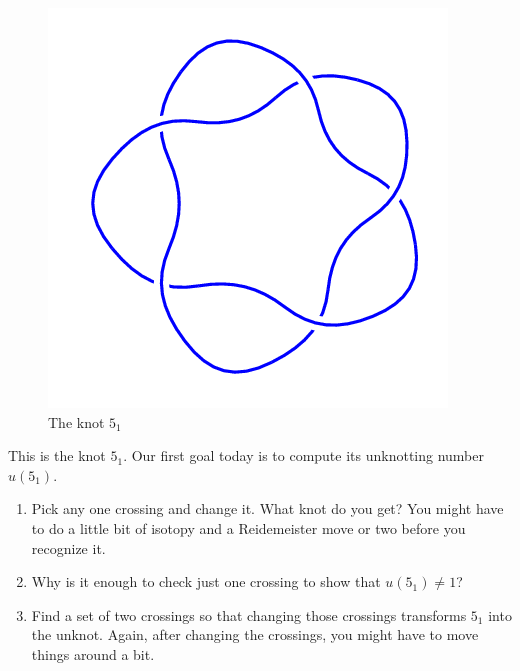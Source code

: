 \documentclass[12pt,letterpaper]{article}
\theoremstyle{definition}
\begin{document}
\setlength{\parskip}{1ex plus 0.5ex minus 0.2ex}
\setlength{\parindent}{0pt}

\pagestyle{fancy}
\cfoot{}


\begin{figure}
    \centering
    \includegraphics[width=.3\textwidth]{rgp12pics/5_1.png}
    \caption{The knot $5_1$}
\end{figure}
This is the knot $5_1$. Our first goal today is to compute its unknotting number $u(5_1)$.
\begin{enumerate}
\item Pick any one crossing and change it.
What knot do you get?
You might have to do a little bit of isotopy and a Reidemeister move or two before you recognize it.

\item Why is it enough to check just one crossing to show that $u(5_1) \neq 1$?

\item Find a set of two crossings so that changing those crossings transforms $5_1$ into the unknot. 
Again, after changing the crossings, you might have to move things around a bit.
\end{enumerate}



\clearpage
\end{document}
